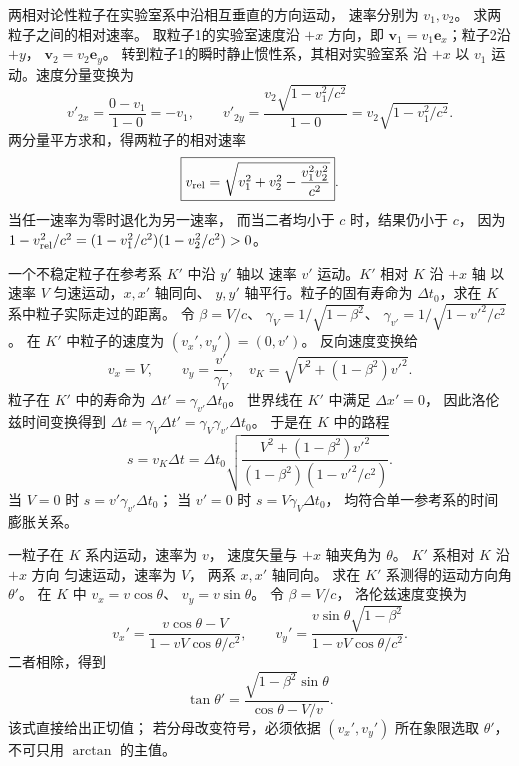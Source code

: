 
两相对论性粒子在实验室系中沿相互垂直的方向运动，
速率分别为 $v_1,v_2$。
求两粒子之间的相对速率。
\exsolution
取粒子1的实验室速度沿 $+x$ 方向，即
$\bm v_1=v_1\bm e_x$；粒子2沿 $+y$，
$\bm v_2=v_2\bm e_y$。
转到粒子1的瞬时静止惯性系，其相对实验室系
沿 $+x$ 以 $v_1$ 运动。速度分量变换为
\[
v'_{2x}=\frac{0-v_1}{1-0}=-v_1,\qquad
v'_{2y}=\frac{v_2\sqrt{1-v_1^2/c^2}}{1-0}
=v_2\sqrt{1-v_1^2/c^2}.
\]
两分量平方求和，得两粒子的相对速率
\[
\boxed{v_{\rm rel}=
\sqrt{v_1^2+v_2^2-\frac{v_1^2v_2^2}{c^2}}}.
\]
\excheck 当任一速率为零时退化为另一速率，
而当二者均小于 $c$ 时，结果仍小于 $c$，
因为
$1-v_{\rm rel}^2/c^2=
(1-v_1^2/c^2)(1-v_2^2/c^2)>0$。

一个不稳定粒子在参考系 $K'$ 中沿 $y'$ 轴以
速率 $v'$ 运动。$K'$ 相对 $K$ 沿 $+x$ 轴
以速率 $V$ 匀速运动，$x,x'$ 轴同向、
$y,y'$ 轴平行。粒子的固有寿命为
$\Delta t_0$，求在 $K$ 系中粒子实际走过的距离。
\exsolution
令 $\beta=V/c$、
$\gamma_V=1/\sqrt{1-\beta^2}$、
$\gamma_{v'}=1/\sqrt{1-v'^2/c^2}$。
在 $K'$ 中粒子的速度为
$(v_x',v_y')=(0,v')$。
反向速度变换给
\[
v_x=V,\qquad v_y=\frac{v'}{\gamma_V},
\quad
v_K=\sqrt{V^2+(1-\beta^2)v'^2}.
\]
粒子在 $K'$ 中的寿命为
$\Delta t'=\gamma_{v'}\Delta t_0$。
世界线在 $K'$ 中满足 $\Delta x'=0$，
因此洛伦兹时间变换得到
$\Delta t=\gamma_V\Delta t'=
\gamma_V\gamma_{v'}\Delta t_0$。
于是在 $K$ 中的路程
\[
\boxed{s=v_K\Delta t=
\Delta t_0\sqrt{
\frac{V^2+(1-\beta^2)v'^2}
{(1-\beta^2)(1-v'^2/c^2)}}}.
\]
\excheck 当 $V=0$ 时
$s=v'\gamma_{v'}\Delta t_0$；
当 $v'=0$ 时
$s=V\gamma_V\Delta t_0$，
均符合单一参考系的时间膨胀关系。

一粒子在 $K$ 系内运动，速率为 $v$，
速度矢量与 $+x$ 轴夹角为 $\theta$。
$K'$ 系相对 $K$ 沿 $+x$ 方向
匀速运动，速率为 $V$，
两系 $x,x'$ 轴同向。
求在 $K'$ 系测得的运动方向角 $\theta'$。
\exsolution
在 $K$ 中
$v_x=v\cos\theta$、
$v_y=v\sin\theta$。
令 $\beta=V/c$，
洛伦兹速度变换为
\[
v_x'=\frac{v\cos\theta-V}
{1-vV\cos\theta/c^2},\qquad
v_y'=\frac{v\sin\theta\sqrt{1-\beta^2}}
{1-vV\cos\theta/c^2}.
\]
二者相除，得到
\[
\boxed{\tan\theta'=
\frac{\sqrt{1-\beta^2}\sin\theta}
{\cos\theta-V/v}}.
\]
\excheck 该式直接给出正切值；
若分母改变符号，必须依据
$(v_x',v_y')$ 所在象限选取
$\theta'$，不可只用 $\arctan$ 的主值。

